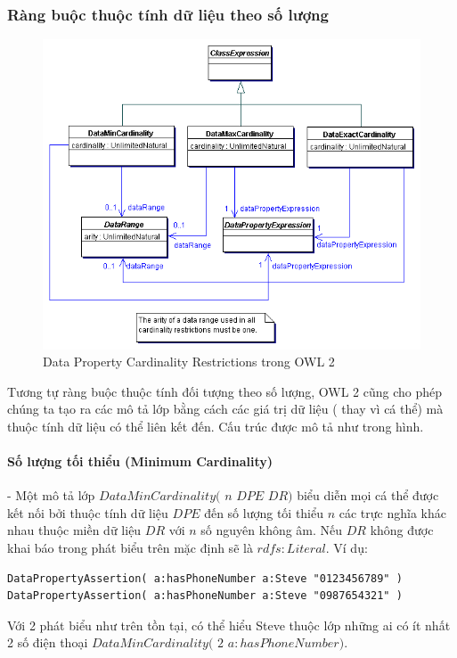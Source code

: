 \subsubsection{Ràng buộc thuộc tính dữ liệu theo số lượng}
\begin{figure}[h]
	\centering
	\includegraphics[width=120mm]{Figures/ce_4.png}
	\caption{Data Property Cardinality Restrictions trong OWL 2\label{overflow}}
\end{figure}
Tương tự ràng buộc thuộc tính đối tượng theo số lượng, OWL 2 cũng cho phép chúng ta tạo ra các mô tả lớp bằng cách các giá trị dữ liệu ( thay vì cá thể) mà thuộc tính dữ liệu có thể liên kết đến. Cấu trúc được mô tả như trong hình.
\paragraph{Số lượng tối thiểu (Minimum Cardinality)} - Một mô tả lớp $DataMinCardinality($ $n$ $DPE$ $DR)$  biểu diễn mọi cá thể được kết nối bởi thuộc tính dữ liệu $DPE$ đến số lượng tối thiểu $n$ các trực nghĩa khác nhau thuộc miền dữ liệu  $DR$ với $n$ số nguyên không âm. Nếu $DR$ không được khai báo trong phát biểu trên mặc định sẽ là $rdfs:Literal$. Ví dụ:
\begin{verbatim}
DataPropertyAssertion( a:hasPhoneNumber a:Steve "0123456789" )
DataPropertyAssertion( a:hasPhoneNumber a:Steve "0987654321" )
\end{verbatim}
Với 2 phát biểu như trên tồn tại, có thể hiểu Steve thuộc lớp những ai có ít nhất 2 số điện thoại $DataMinCardinality($ $2$ $a:hasPhoneNumber)$.


